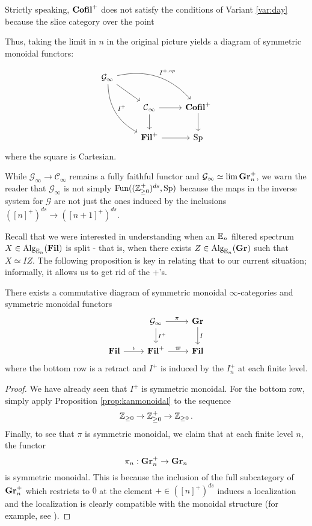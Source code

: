 \begin{rmk}
Strictly speaking, $\operatorname{\textbf{Cofil}}^+$ does not satisfy the conditions of Variant \ref{var:day} because the slice category over the point
\end{rmk}

Thus, taking the limit in $n$ in the original picture yields a diagram of symmetric monoidal functors:

$$
\begin{tikzcd}
\mathcal{G}_\infty
 \arrow[drr, bend left, "I^{+,op}"]
  \arrow[ddr, bend right, "I^+"]
  \arrow[dr] & & \\
&\C_\infty \arrow[r] \arrow[d]&  \Cofil^+ \arrow[d]\\
& \Fil^+ \arrow[r]& \Sp
\end{tikzcd}
$$
where the square is Cartesian.

\begin{rmk}
While $\mathcal{G}_\infty \to \mathcal{C}_\infty$ remains a fully faithful functor and $\mathcal{G}_\infty \simeq \lim \operatorname{\textbf{Gr}}_n^{+}$, we warn the reader that $\mathcal{G}_\infty$ is not simply $\operatorname{\text{Fun}}((\operatorname{\mathbb{Z}}_{\geq 0}^+)^{ds}, \operatorname{\text{Sp}})$ because the maps in the inverse system for $\mathcal{G}$ are not just the ones induced by the inclusions $([n]^+)^{ds} \to ([n+1]^+)^{ds}.$
\end{rmk}


Recall that we were interested in understanding when an $\operatorname{\mathbb{E}}_n$ filtered spectrum $X\in \operatorname{\text{Alg}}_{\operatorname{\mathbb{E}}_n}(\operatorname{\textbf{Fil}})$ is split - that is, when there exists $Z\in \operatorname{\text{Alg}}_{\operatorname{\mathbb{E}}_n}(\operatorname{\textbf{Gr}})$ such that $X \simeq IZ.$  The following proposition is key in relating that to our current situation; informally, it allows us to get rid of the +'s.

\begin{prop}\label{prop:MonRet}
There exists a commutative diagram of symmetric monoidal $\infty$-categories and symmetric monoidal functors 
$$
\begin{tikzcd}
&\mathcal{G}_\infty \arrow[r,"\pi"] \arrow[d, "I^+"]&  \Gr \arrow[d, "I"]\\
\Fil \arrow[r,"\iota"] & \Fil^+ \arrow[r,"\varpi"]& \Fil
\end{tikzcd}
$$
where the bottom row is a retract and $I^+$ is induced by the $I_n^+$ at each finite level.  
\end{prop} 
\begin{proof}
We have already seen that $I^+$ is symmetric monoidal.  For the bottom row, simply apply Proposition \ref{prop:kanmonoidal} to the sequence $$\operatorname{\mathbb{Z}}_{\geq 0} \to \operatorname{\mathbb{Z}}_{\geq 0}^+ \to \operatorname{\mathbb{Z}}_{\geq 0}.$$
Finally, to see that $\pi$ is symmetric monoidal, we claim that at each finite level $n$, the functor $$\pi_n: \operatorname{\textbf{Gr}}_n^+ \to \operatorname{\textbf{Gr}}_n$$ is symmetric monoidal.  This is because the inclusion of the full subcategory of $\operatorname{\textbf{Gr}}_n^+$ which restricts to $0$ at the element $+\in ([n]^+)^{ds}$ induces a localization and the localization is clearly compatible with the monoidal structure (for example, see \cite[Proposition 2.2.1.9]{HA}).%



\end{proof}



